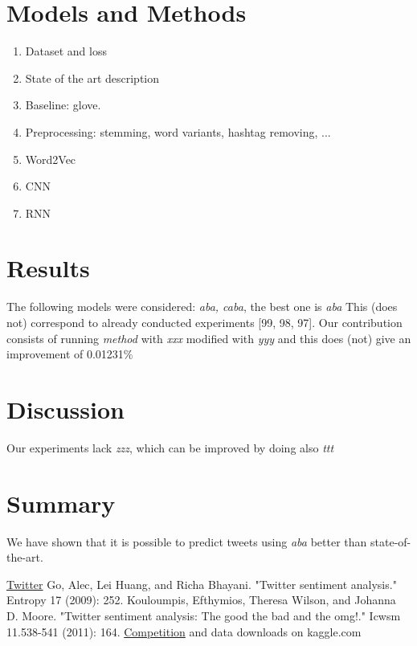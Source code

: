 \documentclass[10pt,conference,compsocconf]{IEEEtran}
\begin{document}
\section{Models and Methods}
\begin{enumerate}
\item Dataset and loss
\item State of the art description
\item Baseline: glove.
\item Preprocessing: stemming, word variants, hashtag removing, ...
\item Word2Vec
\item CNN
\item RNN
\end{enumerate}
\section{Results}
The following models were considered: {\em aba, caba}, the best one is {\em aba} This (does not) correspond to already conducted experiments [99, 98, 97]. Our contribution consists of running {\em method} with {\em xxx} modified with {\em yyy} and this does (not) give an improvement of 0.01231\%
\section{Discussion}
Our experiments lack {\em zzz}, which can be improved by doing also {\em ttt}
\section{Summary}
We have shown that it is possible to predict tweets using {\em aba} better than state-of-the-art.

\begin{thebibliography}{99}
	 \href{http://twitter.com}{Twitter}
	 Go, Alec, Lei Huang, and Richa Bhayani. "Twitter sentiment analysis." Entropy 17 (2009): 252.
	 Kouloumpis, Efthymios, Theresa Wilson, and Johanna D. Moore. "Twitter sentiment analysis: The good the bad and the omg!." Icwsm 11.538-541 (2011): 164.
	 \href{https://www.kaggle.com/c/epfml17-text/data}{Competition} and data downloads on kaggle.com
\end{thebibliography}
\end{document}
